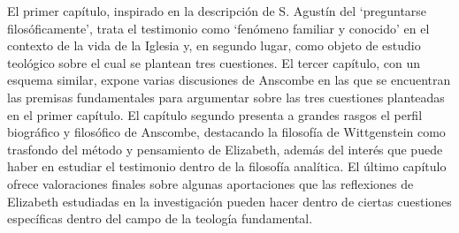 El primer capítulo, inspirado en la descripción de S. Agustín del `preguntarse filosóficamente', trata el testimonio como `fenómeno familiar y conocido' en el contexto de la vida de la Iglesia y, en segundo lugar, como objeto de estudio teológico sobre el cual se plantean tres cuestiones. El tercer capítulo, con un esquema similar, expone varias discusiones de Anscombe en las que se encuentran las premisas fundamentales para argumentar sobre las tres cuestiones planteadas en el primer capítulo. El capítulo segundo presenta a grandes rasgos el perfil biográfico y filosófico de Anscombe, destacando la filosofía de Wittgenstein como trasfondo del método y pensamiento de Elizabeth, además del interés que puede haber en estudiar el testimonio dentro de la filosofía analítica. El último capítulo ofrece valoraciones finales sobre algunas aportaciones que las reflexiones de Elizabeth estudiadas en la investigación pueden hacer dentro de ciertas cuestiones específicas dentro del campo de la teología fundamental.

